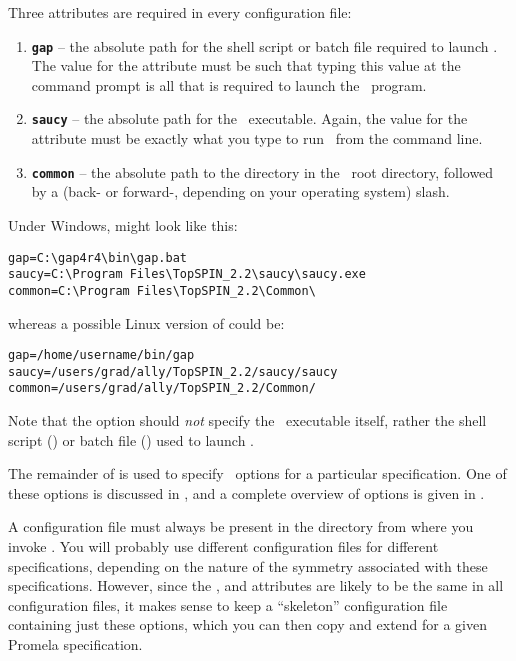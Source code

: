 \noindent Three attributes are required in every configuration file:

\vspace{2mm}
\begin{enumerate}
\item {\bf \texttt{gap}} -- the absolute path for the shell script or batch file
required to launch \gap.  The value for
the  attribute must be such that typing this value at
the command prompt is all that is required to launch the \gap\
program.
\item {\bf \texttt{saucy}}  -- the absolute path for the \saucy\ executable.  Again, the
value for the \inline{saucy} attribute must be exactly what you type
to run \saucy\ from the command line.
\item {\bf \texttt{common}} -- the absolute path to the  directory in
the \topspin\ root directory, followed by a (back- or forward-,
depending on your operating system) slash.
\end{enumerate}
%
Under Windows,  might look like this:
%
\begin{lstlisting}
gap=C:\gap4r4\bin\gap.bat
saucy=C:\Program Files\TopSPIN_2.2\saucy\saucy.exe
common=C:\Program Files\TopSPIN_2.2\Common\
\end{lstlisting}
%
whereas a possible Linux version of  could be:
%
\begin{lstlisting}
gap=/home/username/bin/gap
saucy=/users/grad/ally/TopSPIN_2.2/saucy/saucy
common=/users/grad/ally/TopSPIN_2.2/Common/
\end{lstlisting}
%
Note that the  option should \emph{not} specify the
\gap\ executable itself, rather the shell script ()
or batch file (\inline{gap.bat}) used to launch \gap.

The remainder of  is used to specify \topspin\
options for a particular specification.  One of these options is
discussed in , and a complete overview of
options is given in \chapref{overview}.

A configuration file must always be present in the directory from
where you invoke \topspin.  You will probably use different
configuration files for different specifications, depending on the
nature of the symmetry associated with these specifications.
However, since the \inline{gap}, \inline{saucy} and 
attributes are likely to be the same in all configuration files, it
makes sense to keep a ``skeleton'' configuration file containing
just these options, which you can then copy and extend for a given
Promela specification.

